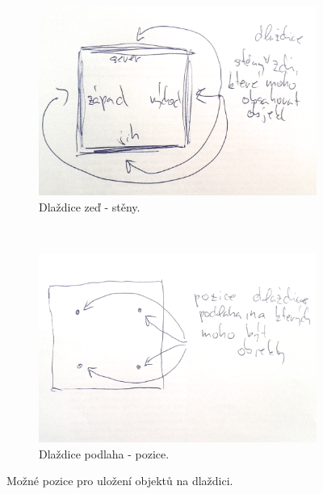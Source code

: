 	\begin{figure}[H]
    \centering
    \begin{subfigure}[b]{0.45\textwidth}
        \includegraphics[width=\textwidth]{./img/DM-wall-sides.png}
        \caption{Dlaždice zeď - stěny.}
        \label{wall:analyza}
    \end{subfigure}
    ~ %
    \begin{subfigure}[b]{0.45\textwidth}
        \includegraphics[width=\textwidth]{./img/DM-floor-spaces.png}
        \caption{Dlaždice podlaha - pozice.}
        \label{floor:analyza}
    \end{subfigure}
    \caption{Možné pozice pro uložení objektů na dlaždici.}\label{tile-positions:analyza}
\end{figure}

